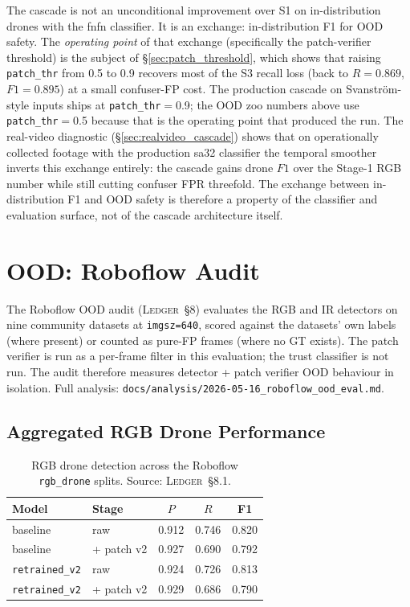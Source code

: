 \documentclass[12pt,a4paper,oneside,openright]{book}
\begin{document}
The cascade is not an unconditional improvement over S1 on in-distribution drones with the fnfn classifier. It is an exchange: in-distribution F1 for OOD safety. The \emph{operating point} of that exchange (specifically the patch-verifier threshold) is the subject of \S\ref{sec:patch_threshold}, which shows that raising \texttt{patch\_thr} from 0.5 to 0.9 recovers most of the S3 recall loss (back to $R=0.869$, $F1=0.895$) at a small confuser-FP cost. The production cascade on Svanstr\"om-style inputs ships at \texttt{patch\_thr}$=$0.9; the OOD zoo numbers above use \texttt{patch\_thr}$=$0.5 because that is the operating point that produced the run. The real-video diagnostic (\S\ref{sec:realvideo_cascade}) shows that on operationally collected footage with the production sa32 classifier the temporal smoother inverts this exchange entirely: the cascade gains drone $F1$ over the Stage-1 RGB number while still cutting confuser FPR threefold. The exchange between in-distribution F1 and OOD safety is therefore a property of the classifier and evaluation surface, not of the cascade architecture itself.

\section{OOD: Roboflow Audit}
\label{sec:roboflow}

The Roboflow OOD audit (\textsc{Ledger}~\S8) evaluates the RGB and IR detectors on nine community datasets at \texttt{imgsz=640}, scored against the datasets' own labels (where present) or counted as pure-FP frames (where no GT exists). The patch verifier is run as a per-frame filter in this evaluation; the trust classifier is not run. The audit therefore measures detector + patch verifier OOD behaviour in isolation. Full analysis: \texttt{docs/analysis/2026-05-16\_roboflow\_ood\_eval.md}.

\subsection{Aggregated RGB Drone Performance}

\begin{table}[htbp]
    \centering
    \caption{RGB drone detection across the Roboflow \texttt{rgb\_drone} splits. Source: \textsc{Ledger}~\S8.1.}
    \label{tab:ood_rgb_drone}
    \begin{tabular}{llccc}
        \toprule
        Model & Stage & $P$ & $R$ & F1 \\
        \midrule
        baseline      & raw           & 0.912 & 0.746 & 0.820 \\
        baseline      & + patch v2    & 0.927 & 0.690 & 0.792 \\
        \texttt{retrained\_v2}  & raw           & 0.924 & 0.726 & 0.813 \\
        \texttt{retrained\_v2}  & + patch v2    & 0.929 & 0.686 & 0.790 \\
        \bottomrule
    \end{tabular}
\end{table}
\end{document}

